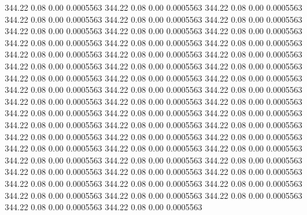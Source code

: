  344.22    0.08    0.00   0.0005563
 344.22    0.08    0.00   0.0005563
 344.22    0.08    0.00   0.0005563
 344.22    0.08    0.00   0.0005563
 344.22    0.08    0.00   0.0005563
 344.22    0.08    0.00   0.0005563
 344.22    0.08    0.00   0.0005563
 344.22    0.08    0.00   0.0005563
 344.22    0.08    0.00   0.0005563
 344.22    0.08    0.00   0.0005563
 344.22    0.08    0.00   0.0005563
 344.22    0.08    0.00   0.0005563
 344.22    0.08    0.00   0.0005563
 344.22    0.08    0.00   0.0005563
 344.22    0.08    0.00   0.0005563
 344.22    0.08    0.00   0.0005563
 344.22    0.08    0.00   0.0005563
 344.22    0.08    0.00   0.0005563
 344.22    0.08    0.00   0.0005563
 344.22    0.08    0.00   0.0005563
 344.22    0.08    0.00   0.0005563
 344.22    0.08    0.00   0.0005563
 344.22    0.08    0.00   0.0005563
 344.22    0.08    0.00   0.0005563
 344.22    0.08    0.00   0.0005563
 344.22    0.08    0.00   0.0005563
 344.22    0.08    0.00   0.0005563
 344.22    0.08    0.00   0.0005563
 344.22    0.08    0.00   0.0005563
 344.22    0.08    0.00   0.0005563
 344.22    0.08    0.00   0.0005563
 344.22    0.08    0.00   0.0005563
 344.22    0.08    0.00   0.0005563
 344.22    0.08    0.00   0.0005563
 344.22    0.08    0.00   0.0005563
 344.22    0.08    0.00   0.0005563
 344.22    0.08    0.00   0.0005563
 344.22    0.08    0.00   0.0005563
 344.22    0.08    0.00   0.0005563
 344.22    0.08    0.00   0.0005563
 344.22    0.08    0.00   0.0005563
 344.22    0.08    0.00   0.0005563
 344.22    0.08    0.00   0.0005563
 344.22    0.08    0.00   0.0005563
 344.22    0.08    0.00   0.0005563
 344.22    0.08    0.00   0.0005563
 344.22    0.08    0.00   0.0005563
 344.22    0.08    0.00   0.0005563
 344.22    0.08    0.00   0.0005563
 344.22    0.08    0.00   0.0005563
 344.22    0.08    0.00   0.0005563
 344.22    0.08    0.00   0.0005563
 344.22    0.08    0.00   0.0005563
